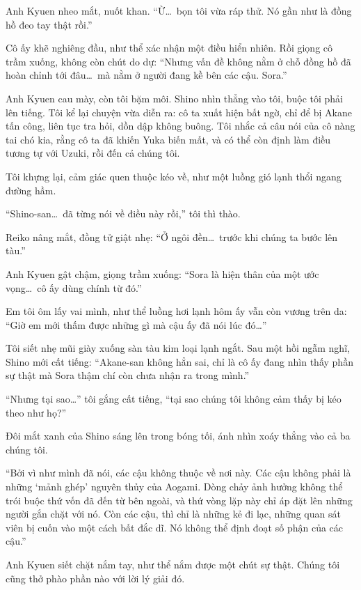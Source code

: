 \documentclass[../main.tex]{subfiles}
\begin{document}
Anh Kyuen nheo mắt, nuốt khan. ``Ừ\dots\ bọn tôi vừa ráp thử. Nó gần như là đồng hồ đeo tay thật rồi.''

Cô ấy khẽ nghiêng đầu, như thể xác nhận một điều hiển nhiên. Rồi giọng cô trầm xuống, không còn chút do dự: ``Nhưng vấn đề không nằm ở chỗ đồng hồ đã hoàn chỉnh tới đâu\dots\ mà nằm ở người đang kề bên các cậu. Sora.''

Anh Kyuen cau mày, còn tôi bặm môi. Shino nhìn thẳng vào tôi, buộc tôi phải lên tiếng. Tôi kể lại chuyện vừa diễn ra: cô ta xuất hiện bất ngờ, chỉ để bị Akane tấn công, liên tục tra hỏi, dồn dập không buông. Tôi nhắc cả câu nói của cô nàng tai chó kia, rằng cô ta đã khiến Yuka biến mất, và có thể còn định làm điều tương tự với Uzuki, rồi đến cả chúng tôi.

Tôi khựng lại, cảm giác quen thuộc kéo về, như một luồng gió lạnh thổi ngang đường hầm.

``Shino-san\dots\ đã từng nói về điều này rồi,'' tôi thì thào.

Reiko nâng mắt, đồng tử giật nhẹ: ``Ở ngôi đền\dots\ trước khi chúng ta bước lên tàu.''

Anh Kyuen gật chậm, giọng trầm xuống: ``Sora là hiện thân của một ước vọng\dots\ cô ấy dùng chính từ đó.''

Em tôi ôm lấy vai mình, như thể luồng hơi lạnh hôm ấy vẫn còn vương trên da: ``Giờ em mới thấm được những gì mà cậu ấy đã nói lúc đó\dots''

Tôi siết nhẹ mũi giày xuống sàn tàu kim loại lạnh ngắt. Sau một hồi ngẫm nghĩ, Shino mới cất tiếng: ``Akane-san không hẳn sai, chỉ là cô ấy đang nhìn thấy phần sự thật mà Sora thậm chí còn chưa nhận ra trong mình.''

``Nhưng tại sao\dots'' tôi gắng cất tiếng, ``tại sao chúng tôi không cảm thấy bị kéo theo như họ?''

Đôi mắt xanh của Shino sáng lên trong bóng tối, ánh nhìn xoáy thẳng vào cả ba chúng tôi.

``Bởi vì như mình đã nói, các cậu không thuộc về nơi này. Các cậu không phải là những `mảnh ghép' nguyên thủy của Aogami. Dòng chảy ảnh hưởng không thể trói buộc thứ vốn đã đến từ bên ngoài, và thứ vòng lặp này chỉ áp đặt lên những người gắn chặt với nó. Còn các cậu, thì chỉ là những kẻ đi lạc, những quan sát viên bị cuốn vào một cách bất đắc dĩ. Nó không thể định đoạt số phận của các cậu.''

Anh Kyuen siết chặt nắm tay, như thể nắm được một chút sự thật. Chúng tôi cũng thở phào phần nào với lời lý giải đó.
\end{document}

